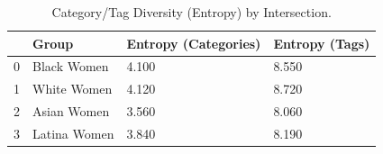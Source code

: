 \begin{table}[htbp]
\centering
\caption{Category/Tag Diversity (Entropy) by Intersection.}
\label{tab:eda_entropy_by_group}
\begin{tabular}{llll}
\toprule
 & Group & Entropy (Categories) & Entropy (Tags) \\
\midrule
0 & Black Women & 4.100 & 8.550 \\
1 & White Women & 4.120 & 8.720 \\
2 & Asian Women & 3.560 & 8.060 \\
3 & Latina Women & 3.840 & 8.190 \\
\bottomrule
\end{tabular}

\end{table}
